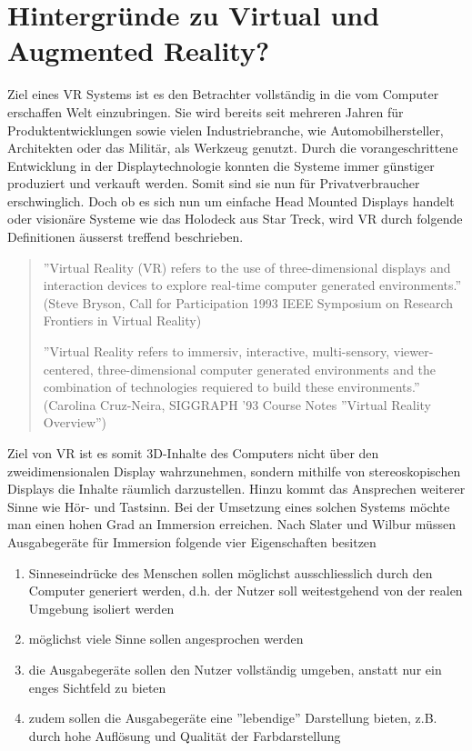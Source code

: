 \chapter{Hintergründe zu Virtual und Augmented Reality?}\label{c.wasist}
\vspace{-20pt}
Ziel eines VR Systems ist es den Betrachter vollständig in die vom Computer erschaffen Welt einzubringen. Sie wird bereits seit mehreren Jahren für Produktentwicklungen sowie vielen Industriebranche, wie Automobilhersteller, Architekten oder das Militär, als Werkzeug genutzt. Durch die vorangeschrittene Entwicklung in der Displaytechnologie konnten die Systeme immer günstiger produziert und verkauft werden. Somit sind sie nun für Privatverbraucher erschwinglich. Doch ob es sich nun um einfache Head Mounted Displays handelt oder visionäre Systeme wie das Holodeck aus Star Treck, wird VR durch folgende Definitionen äusserst treffend beschrieben.
\begin{quote}
''Virtual Reality (VR) refers to the use of three-dimensional displays and interaction devices to explore real-time computer generated environments.''\\
(Steve Bryson, Call for Participation 1993 IEEE Symposium on Research Frontiers in Virtual Reality)

''Virtual Reality refers to immersiv, interactive, multi-sensory, viewer-centered, three-dimensional computer generated environments and the combination of technologies requiered to build these environments.''\\
(Carolina Cruz-Neira, SIGGRAPH '93 Course Notes ''Virtual Reality Overview'')
\end{quote}
Ziel von VR ist es somit 3D-Inhalte des Computers nicht über den zweidimensionalen Display wahrzunehmen, sondern mithilfe von stereoskopischen Displays die Inhalte räumlich darzustellen. Hinzu kommt das Ansprechen weiterer Sinne wie Hör- und Tastsinn. Bei der Umsetzung eines solchen Systems möchte man einen hohen Grad an Immersion erreichen. Nach Slater und Wilbur \cite[S.~5~ff.]{slaterwilbur97} müssen Ausgabegeräte für Immersion folgende vier Eigenschaften besitzen
\begin{enumerate}\itemsep1pt \parskip0pt 
	\item Sinneseindrücke des Menschen sollen möglichst ausschliesslich durch den Computer generiert werden, d.h. der Nutzer soll weitestgehend von der realen Umgebung isoliert werden
	\item möglichst viele Sinne sollen angesprochen werden
	\item die Ausgabegeräte sollen den Nutzer vollständig umgeben, anstatt nur ein enges Sichtfeld zu bieten
	\item zudem sollen die Ausgabegeräte eine ''lebendige'' Darstellung bieten, z.B. durch hohe Auflösung und Qualität der Farbdarstellung
\end{enumerate}
